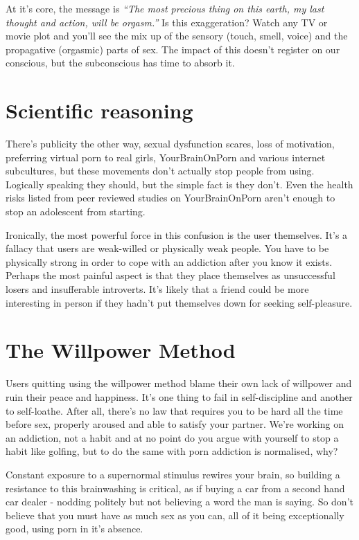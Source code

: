 \documentclass[
]{book}
\begin{document}
At it's core, the message is \emph{``The most precious thing on this earth, my last thought and action, will be orgasm.''} Is this exaggeration? Watch any TV or movie plot and you'll see the mix up of the sensory (touch, smell, voice) and the propagative (orgasmic) parts of sex. The impact of this doesn't register on our conscious, but the subconscious has time to absorb it.

\hypertarget{scientific-reasoning}{%
\section{Scientific reasoning}\label{scientific-reasoning}}

There's publicity the other way, sexual dysfunction scares, loss of motivation, preferring virtual porn to real girls, YourBrainOnPorn and various internet subcultures, but these movements don't actually stop people from using. Logically speaking they should, but the simple fact is they don't. Even the health risks listed from peer reviewed studies on YourBrainOnPorn aren't enough to stop an adolescent from starting.

Ironically, the most powerful force in this confusion is the user themselves. It's a fallacy that users are weak-willed or physically weak people. You have to be physically strong in order to cope with an addiction after you know it exists. Perhaps the most painful aspect is that they place themselves as unsuccessful losers and insufferable introverts. It's likely that a friend could be more interesting in person if they hadn't put themselves down for seeking self-pleasure.

\hypertarget{the-willpower-method}{%
\section{The Willpower Method}\label{the-willpower-method}}

Users quitting using the willpower method blame their own lack of willpower and ruin their peace and happiness. It's one thing to fail in self-discipline and another to self-loathe. After all, there's no law that requires you to be hard all the time before sex, properly aroused and able to satisfy your partner. We're working on an addiction, not a habit and at no point do you argue with yourself to stop a habit like golfing, but to do the same with porn addiction is normalised, why?

Constant exposure to a supernormal stimulus rewires your brain, so building a resistance to this brainwashing is critical, as if buying a car from a second hand car dealer - nodding politely but not believing a word the man is saying. So don't believe that you must have as much sex as you can, all of it being exceptionally good, using porn in it's absence.
\end{document}
